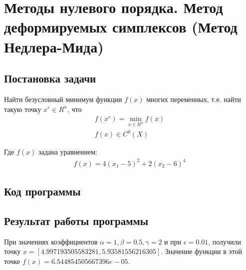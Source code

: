 \section{Методы нулевого порядка. Метод деформируемых симплексов (Метод Недлера-Мида)}
    \subsection{Постановка задачи}
        Найти безусловный минимум функции $f(x)$ многих переменных, т.е. найти такую точку $x^e \in R^n$, что 
        \begin{gather}
        f(x^e) = \min_{x \in R^n}f(x) \nonumber \\
        f(x) \in C^0(X) \nonumber
        \end{gather}

        Где $f(x)$ задана уравнением:
        \begin{gather}
        f(x) = 4(x_1 - 5)^2 + 2(x_2 - 6)^4 \nonumber
        \end{gather}

    \subsection{Код программы}
        
    \subsection{Результат работы программы}
        При значениях коэффициентов $\alpha = 1, \beta = 0.5, \gamma = 2$ и при $\epsilon = 0.01$, получили точку $x = [4.997193505583281, 5.93581556216305]$.
        Значение функции в этой точке $f(x) = 6.544854505667396e-05$.